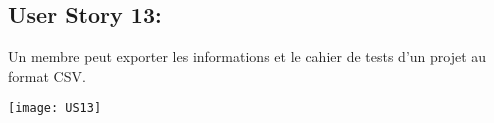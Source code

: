\newpage{}
\subsection{User Story 13:}
Un membre peut exporter les informations et le cahier de tests d'un projet au format CSV.

  \begin{center}
        \texttt{[image: US13]}
  \end{center}